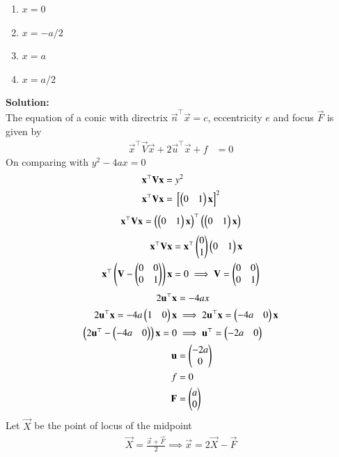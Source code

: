 \documentclass[journal]{IEEEtran}
\begin{document}
\begin{multicols}{4}
\begin{enumerate}
    \item $x=0$
    \item $x=-a/2$
    \item $x=a$
    \item $x=a/2$
\end{enumerate}
\end{multicols}
\textbf{Solution:}  \\
The equation of a conic with directrix $\vec{n}^\top \vec{x} = c$, eccentricity $e$ and focus $\vec{F}$ is given
by
\begin{align}
  \vec{x}^\top\vec{V}\vec{x} + 2\vec{u}^\top\vec{x} + f &= 0 
\end{align}
On comparing with $y^2-4ax=0$
\begin{align}
    \mathbf{x}^\top\mathbf{V}\mathbf{x}&= y^2\\  
    \mathbf{x}^\top\mathbf{V}\mathbf{x}&= {}\left[\begin{pmatrix}0 &1\end{pmatrix}\mathbf{x}\right]^2 
    \end{align}
    \begin{align}
     \mathbf{x}^\top\mathbf{V}\mathbf{x}= \left(\begin{pmatrix}0 &1\end{pmatrix}\mathbf{x}\right)^\top\left(\begin{pmatrix}0 &1\end{pmatrix}\mathbf{x}\right)\end{align}
     \begin{align}
         \mathbf{x}^\top\mathbf{V}\mathbf{x}&= \mathbf{x}^\top\begin{pmatrix}0 \\1\end{pmatrix}\begin{pmatrix}0 &1\end{pmatrix}\mathbf{x}\\
         \mathbf{x}^\top\begin{pmatrix}\mathbf{V-\begin{pmatrix}0 &0\\0&1\end{pmatrix}}\end{pmatrix}\mathbf{x}&=0 \implies \mathbf{V}=\begin{pmatrix}0 &0\\0&1\end{pmatrix}
     \end{align}
     \begin{align}
     2\mathbf{u}^\top\mathbf{x}&=-4ax\\
     2\mathbf{u}^\top\mathbf{x}=-4a\begin{pmatrix}1 & 0\end{pmatrix}\mathbf{x} &\implies  2\mathbf{u}^\top\mathbf{x}=\begin{pmatrix}-4a & 0\end{pmatrix}\mathbf{x}\\
     \left(2\mathbf{u}^\top-\begin{pmatrix}-4a & 0\end{pmatrix}\right)\mathbf{x}=0 &\implies \mathbf{u}^\top=\begin{pmatrix}-2a & 0\end{pmatrix}\\
     \mathbf{u}&=\begin{pmatrix}-2a\\0\end{pmatrix}\\
     f&=0\\
     \mathbf{F}&=\begin{pmatrix}a\\0\end{pmatrix}
     \end{align}
Let $\vec{X}$ be the point of locus of the midpoint
\begin{align}
    \vec{X}=\frac{\vec{x}+\vec{F}}{2}\implies
    \vec{x}=2\vec{X}-\vec{F}
\end{align}     
\end{document}
